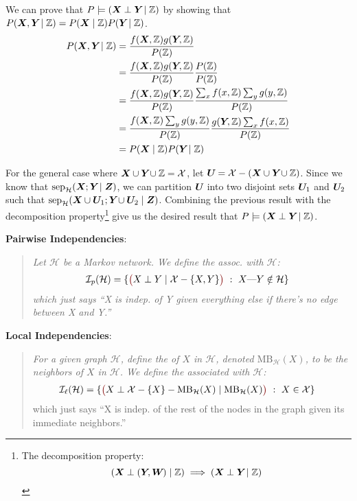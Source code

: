 \documentclass[11pt]{article}
\begin{document}
\begin{compactitem}
\begin{example}[Proof]
\begin{compactitem}
		\item We can prove that $P \models (\X \perp \Y \mid \Z)$ by showing that $P(\X, \Y \mid \Z) = P(\X \mid \Z) P(\Y \mid \Z)$. 
		\begin{align}
			P(\X, \Y \mid \Z) &= \frac{f(\X, \Z) g(\Y, \Z)}{P(\Z)} \\
			&=  \frac{f(\X, \Z) g(\Y, \Z)}{P(\Z)} \frac{P(\Z)}{P(\Z)} \\
			&=  \frac{f(\X, \Z) g(\Y, \Z)}{P(\Z)} \frac{ \sum_x f(x, \Z) \sum_y g(y, \Z) }{ P(\Z) } \\
			&=  \frac{f(\X, \Z)  \sum_y g(y, \Z) }{P(\Z)} \frac{ g(\Y, \Z) \sum_x f(x, \Z)}{ P(\Z) } \\
			&= P(\X \mid \Z) P(\Y \mid \Z)
		\end{align} 
		
		\item For the general case where $\X \cup \Y \cup \Z = \mathcal{X}$, let $\matr{U} = \mathcal{X} - (\X \cup \Y \cup \Z )$. Since we know that $\sep (\matr X ; \matr Y \mid \matr Z)$, we can partition $\matr U$ into two disjoint sets $\matr[1]{U}$ and $\matr[2]{U}$ such that $\sep (\matr X \cup \matr[1]{U} ; \matr Y \cup \matr[2]{U}\mid \matr Z)$. Combining the previous result with the decomposition property\footnote{The decomposition property:$$(\X \perp (\Y, \matr{W}) \mid \Z) \implies (\X \perp \Y \mid \Z)$$} give us the desired result that $P \models (\X \perp \Y \mid \Z)$.
	\end{compactitem}
	\end{example}
\end{compactitem}

\myspace
\p \textbf{Pairwise Independencies}:
\vspace{-0.5em}
\begin{quote}
	{\itshape 
		Let $\mathcal H$ be a Markov network. We define the  assoc. with $\mathcal{H}$:
		\begin{align}
			\mathcal{I}_{p}(\mathcal H) &= \{ \mred{\big(} X \perp Y \mid \mathcal X  - \{X,Y\} \mred{\big)} ~ : ~ X\text{---}Y \notin \mathcal H  \}
		\end{align}
		which just says ``X is indep. of Y given everything else if there's no edge between X and Y.''
	}
\end{quote}

\newcommand\MB{\mathrm{MB}_{\mathcal H}}

\myspace
\p \textbf{Local Independencies}:
\vspace{-0.5em}
\begin{quote}
	{\itshape 
		For a given graph $\mathcal H$, define the  of $X$ in $\mathcal H$, denoted $\MB(X)$, to be the neighbors of $X$ in $\mathcal{H}$. We define the  associated with $\mathcal H$:
		\begin{align}
			\mathcal{I}_{\ell}(\mathcal H) &= \{ \mred{\big(}X \perp \mathcal X - \{X\}  - \MB(X) \mid \MB(X)  \mred{\big)}  ~ : ~ X \in \mathcal X   \}
		\end{align}
	}
	which just says ``X is indep. of the rest of the nodes in the graph given its immediate neighbors.''
\end{quote}
\end{document}
